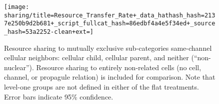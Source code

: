 \begin{figure*}[!htbp]
\begin{center}

\texttt{[image: sharing/title=Resource\_Transfer\_Rate+\_data\_hathash\_hash=2137e250b9d2b681+\_script\_fullcat\_hash=86edbf4a4e5f34ed+\_source\_hash=53a2252-clean+ext=]}

\caption{
Resource sharing to mutually exclusive sub-categories same-channel cellular neighbors: cellular child, cellular parent, and neither (``non-nuclear'').
Resource sharing to entirely non-related cells (no cell, channel, or propagule relation) is included for comparison.
Note that level-one groups are not defined in either of the flat treatments.
Error bars indicate 95\% confidence.
}
\label{fig:sharing_channelmate}
\end{center}
\end{figure*}
